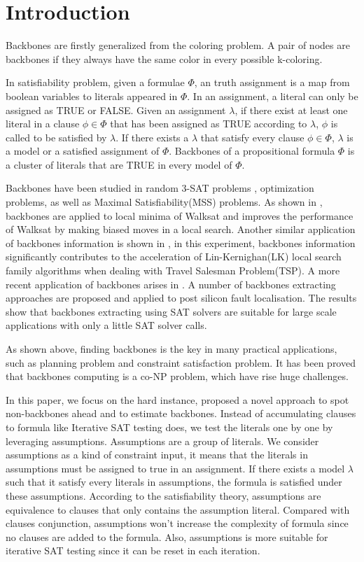 
\section{Introduction}

Backbones are firstly generalized from the coloring problem. A pair of nodes are backbones if they always have the same color in every possible k-coloring\cite{WTS2001}.

In satisfiability problem, given a formulae $\Phi$, an truth assignment is a map from boolean variables to literals appeared in $\Phi$. In an assignment, a literal can only be assigned as TRUE or FALSE. Given an assignment $\lambda$, if there exist at least one literal in a clause $\phi\in\Phi$ that has been assigned as TRUE according to $\lambda$, $\phi$ is called to be satisfied by $\lambda$. If there exists a $\lambda$ that satisfy every clause $\phi\in\Phi$, $\lambda$ is a model or a satisfied assignment of $\Phi$.
Backbones of a propositional formula $\Phi$ is a cluster of literals that are TRUE in every model of $\Phi$\cite{BCJ2001,KPJ2005}.

Backbones have been studied in random 3-SAT problems \cite{DOG2001}, optimization problems\cite{CJG2001,KPS2005,WTS2001}, as well as Maximal Satisfiability(MSS) problems\cite{MM2005}.
As shown in \cite{ZWR2003}, backbones are applied to local minima of Walksat and improves the performance of Walksat by making biased moves in a local search. Another similar application of backbones information is shown in \cite{ZWL2005}, in this experiment, backbones information significantly contributes to the acceleration of Lin-Kernighan(LK) local search family algorithms when dealing with Travel Salesman Problem(TSP).
A more recent application of backbones arises in \cite{Z11}. A number of backbones extracting approaches are proposed and applied to post silicon fault localisation. The results show that backbones extracting using SAT solvers are suitable for large scale applications with only a little SAT solver calls.

As shown above, finding backbones is the key in many practical applications, such as planning problem and constraint satisfaction problem. It has been proved that backbones computing is a co-NP problem\cite{Jan10}, which have rise huge challenges.

In this paper, we focus on the hard instance, proposed a novel approach to spot non-backbones ahead and to estimate backbones. Instead of accumulating clauses to formula like Iterative SAT testing does, we test the literals one by one by leveraging assumptions. Assumptions are a group of literals. We consider assumptions as a kind of constraint input, it means that the literals in assumptions must be assigned to true in an assignment. If there exists a model $\lambda$ such that it satisfy every literals in assumptions, the formula is satisfied under these assumptions. According to the satisfiability theory, assumptions are equivalence to clauses that only contains the assumption literal. Compared with clauses conjunction, assumptions won't increase the complexity of formula since no clauses are added to the formula. Also, assumptions is more suitable for iterative SAT testing since it can be reset in each iteration.

